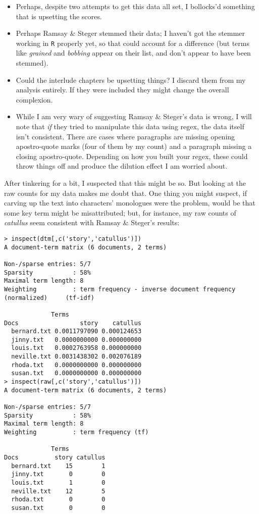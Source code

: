 \documentclass[
  12pt,
]{article}
\providecommand{\tightlist}{%
  \setlength{\itemsep}{0pt}\setlength{\parskip}{0pt}}
\begin{document}
\begin{itemize}
\tightlist
\item
  Perhaps, despite two attempts to get this data all set, I bollocks'd
  something that is upsetting the scores.
\item
  Perhaps Ramsay \& Steger stemmed their data; I haven't got the stemmer
  working in \texttt{R} properly yet, so that could account for a
  difference (but terms like \emph{grained} and \emph{bobbing} appear on
  their list, and don't appear to have been stemmed).
\item
  Could the interlude chapters be upsetting things? I discard them from
  my analysis entirely. If they were included they might change the
  overall complexion.
\item
  While I am very wary of suggesting Ramsay \& Steger's data is wrong, I
  will note that \emph{if} they tried to manipulate this data using
  regex, the data itself isn't consistent. There are cases where
  paragraphs are missing opening apostro-quote marks (four of them by my
  count) and a paragraph missing a closing apostro-quote. Depending on
  how you built your regex, these could throw things off and produce the
  dilution effect I am worried about.
\end{itemize}

After tinkering for a bit, I suspected that this might be so. But
looking at the raw counts for my data makes me doubt that. One thing you
might suspect, if carving up the text into characters' monologues were
the problem, would be that some key term might be misattributed; but,
for instance, my raw counts of \emph{catullus} seem consistent with
Ramsay \& Steger's results:

\begin{verbatim}
> inspect(dtm[,c('story','catullus')])
A document-term matrix (6 documents, 2 terms)

Non-/sparse entries: 5/7
Sparsity           : 58%
Maximal term length: 8 
Weighting          : term frequency - inverse document frequency (normalized)     (tf-idf)

             Terms
Docs                 story    catullus
  bernard.txt 0.0011797090 0.000124653
  jinny.txt   0.0000000000 0.000000000
  louis.txt   0.0002763958 0.000000000
  neville.txt 0.0031438302 0.002076189
  rhoda.txt   0.0000000000 0.000000000
  susan.txt   0.0000000000 0.000000000
> inspect(raw[,c('story','catullus')])
A document-term matrix (6 documents, 2 terms)

Non-/sparse entries: 5/7
Sparsity           : 58%
Maximal term length: 8 
Weighting          : term frequency (tf)

             Terms
Docs          story catullus
  bernard.txt    15        1
  jinny.txt       0        0
  louis.txt       1        0
  neville.txt    12        5
  rhoda.txt       0        0
  susan.txt       0        0
\end{verbatim}
\end{document}
